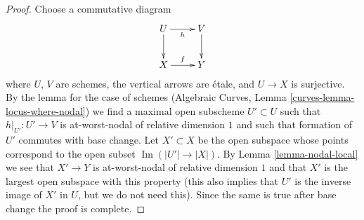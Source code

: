 \documentclass[10pt,a4paper]{amsart}
\theoremstyle{plain}
\theoremstyle{definition}
\theoremstyle{remark}
\numberwithin{equation}{subsection}
\def\Im{\mathop{\mathrm{Im}}}
\begin{document}
\begin{proof}
Choose a commutative diagram
$$
\xymatrix{
U \ar[d] \ar[r]_h & V \ar[d] \\
X \ar[r]^f & Y
}
$$
where $U$, $V$ are schemes, the vertical arrows are \'etale, and
$U \to X$ is surjective. By the lemma for the case of schemes
(Algebraic Curves, Lemma \ref{curves-lemma-locus-where-nodal})
we find a maximal open subscheme $U' \subset U$
such that $h|_{U'} : U' \to V$ is at-worst-nodal of relative dimension $1$
and such that formation of $U'$ commutes with base change.
Let $X' \subset X$ be the open subspace whose points correspond
to the open subset $\Im(|U'| \to |X|)$.
By Lemma \ref{lemma-nodal-local} we see that $X' \to Y$ is
at-worst-nodal of relative dimension $1$ and that $X'$ is the
largest open subspace with this property (this also implies
that $U'$ is the inverse image of $X'$ in $U$, but we do
not need this). Since the same is true after base change
the proof is complete.
\end{proof}
\end{document}
